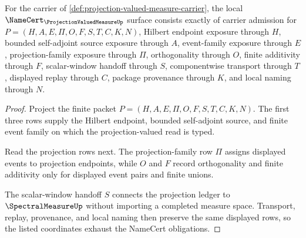 \begin{theorem}
\label{thm:projection-valued-measure-namecert-obligations}
For the carrier of \autoref{def:projection-valued-measure-carrier}, the local $\NameCert_{\ProjectionValuedMeasureUp}$ surface consists exactly of carrier admission for $P=(H,A,E,\Pi,O,F,S,T,C,K,N)$, Hilbert endpoint exposure through $H$, bounded self-adjoint source exposure through $A$, event-family exposure through $E$, projection-family exposure through $\Pi$, orthogonality through $O$, finite additivity through $F$, scalar-window handoff through $S$, componentwise transport through $T$, displayed replay through $C$, package provenance through $K$, and local naming through $N$.
\end{theorem}
\begin{proof}
Project the finite packet $P=(H,A,E,\Pi,O,F,S,T,C,K,N)$. The first three rows supply the Hilbert endpoint, bounded self-adjoint source, and finite event family on which the projection-valued read is typed.

Read the projection rows next. The projection-family row $\Pi$ assigns displayed events to projection endpoints, while $O$ and $F$ record orthogonality and finite additivity only for displayed event pairs and finite unions.

The scalar-window handoff $S$ connects the projection ledger to $\SpectralMeasureUp$ without importing a completed measure space. Transport, replay, provenance, and local naming then preserve the same displayed rows, so the listed coordinates exhaust the NameCert obligations.
\end{proof}

